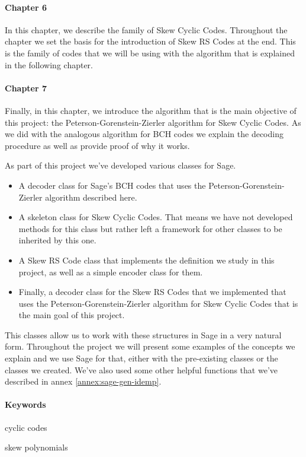\paragraph{Chapter 6} In this chapter, we describe the family of Skew Cyclic Codes.
Throughout the chapter we set the basis for the introduction of Skew RS Codes at the end.
This is the family of codes that we will be using with the algorithm that is explained in the following chapter.

\paragraph{Chapter 7} Finally, in this chapter, we introduce the algorithm that is the main objective of this project: the Peterson-Gorenstein-Zierler algorithm for Skew Cyclic Codes.
As we did with the analogous algorithm for BCH codes we explain the decoding procedure as well as provide proof of why it works.

As part of this project we've developed various classes for Sage.
\begin{itemize}
  \item A decoder class for Sage's BCH codes that uses the Peterson-Gorenstein-Zierler algorithm described here.
  \item A skeleton class for Skew Cyclic Codes. That means we have not developed methods for this class but rather left a framework for other classes to be inherited by this one.
  \item A Skew RS Code class that implements the definition we study in this project, as well as a simple encoder class for them.
  \item Finally, a decoder class for the Skew RS Codes that we implemented that uses the Peterson-Gorenstein-Zierler algorithm for Skew Cyclic Codes that is the main goal of this project.
\end{itemize}

This classes allow us to work with these structures in Sage in a very natural form.
Throughout the project we will present some examples of the concepts we explain and we use Sage for that, either with the pre-existing classes or the classes we created.
We've also used some other helpful functions that we've described in annex \ref{annex:sage-gen-idemp}.

\paragraph{Keywords}
\begin{itemize*}[label=,itemsep=4em,itemjoin=\hspace{2em}]
  \item cyclic codes 
  \item skew polynomials
\end{itemize*}